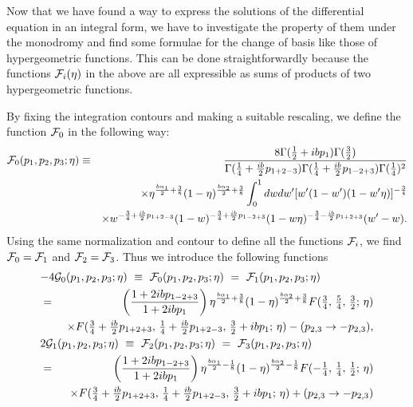 \documentclass[a4paper,12pt]{article}
\newcommand{\tfrac}[2]{{\textstyle\frac{#1}{#2}}}
\newcommand{\cF}{{\cal F}}
\newcommand{\cG}{{\cal G}}
\begin{document}
   Now that we have found a way to express the solutions of the
 differential equation in an integral form, we have to investigate
 the property of them under the monodromy and find some formulae
 for the change of basis like those of hypergeometric functions.
 This can be done straightforwardly because the functions $\cF_i(\eta)$
 in the above are all expressible as sums of products of
 two hypergeometric functions.

   By fixing the integration contours and making
 a suitable rescaling, we define the function $\cF_0$
 in the following way:
\begin{eqnarray}
 \cF_0(p_1,p_2,p_3;\eta)
 &\equiv&
  \frac{8\Gamma(\frac{1}{2}+ibp_1)\Gamma(\frac{3}{2})}
       {\Gamma(\frac{1}{4}+\frac{ib}{2}p_{1+2-3})
        \Gamma(\frac{1}{4}+\frac{ib}{2}p_{1-2+3})
        \Gamma(\frac{1}{4})^2}
\nonumber \\ && \times
  \eta    ^{\frac{b\alpha_1}{2}+\frac{3}{8}}
  (1-\eta)^{\frac{b\alpha_2}{2}+\frac{3}{8}}
  \int_0^1dwdw'
  [w'(1-w')(1-w'\eta)]^{-\frac{3}{4}}
\nonumber \\ && \times
  w^{-\frac{3}{4}+\frac{ib}{2}p_{1+2-3}}
  (1-w)^{-\frac{3}{4}+\frac{ib}{2}p_{1-2+3}}
  (1-w\eta)^{-\frac{3}{4}-\frac{ib}{2}p_{1+2+3}}
  (w'-w).
\end{eqnarray}
   Using the same normalization and contour to define all the functions
 $\cF_i$, we find $\cF_0=\cF_1$ and $\cF_2=\cF_3$.
 Thus we introduce the following functions
\begin{eqnarray}
\lefteqn{
 -4\cG_0(p_1,p_2,p_3;\eta) ~\equiv~
   \cF_0(p_1,p_2,p_3;\eta) ~=~
   \cF_1(p_1,p_2,p_3;\eta) }\nonumber \\
 &=&
  \left(\frac{1+2ibp_{1-2+3}}{1+2ibp_1}\right)
  \eta    ^{\frac{b\alpha_1}{2}+\frac{3}{8}}
  (1-\eta)^{\frac{b\alpha_2}{2}+\frac{3}{8}}
  F(\tfrac{3}{4},\,\tfrac{5}{4},\,\tfrac{3}{2};\,\eta)
\nonumber \\ && ~\times
  F(\tfrac{3}{4}+\tfrac{ib}{2}p_{1+2+3},\,
    \tfrac{1}{4}+\tfrac{ib}{2}p_{1+2-3},\,
    \tfrac{3}{2}+ibp_1;\,\eta)
  -(p_{2,3}\rightarrow -p_{2,3}),
\nonumber \\
\lefteqn{
  2\cG_1(p_1,p_2,p_3;\eta) ~\equiv~
   \cF_2(p_1,p_2,p_3;\eta) ~=~
   \cF_3(p_1,p_2,p_3;\eta) }\nonumber \\
 &=&
  \left(\frac{1+2ibp_{1-2+3}}{1+2ibp_1}\right)
  \eta    ^{\frac{b\alpha_1}{2}-\frac{1}{8}}
  (1-\eta)^{\frac{b\alpha_2}{2}-\frac{1}{8}}
  F(-\tfrac{1}{4},\,\tfrac{1}{4},\,\tfrac{1}{2};\,\eta)
\nonumber \\ && ~\times
  F(\tfrac{3}{4}+\tfrac{ib}{2}p_{1+2+3},\,
    \tfrac{1}{4}+\tfrac{ib}{2}p_{1+2-3},\,
    \tfrac{3}{2}+ibp_1;\,\eta)
  +(p_{2,3}\rightarrow -p_{2,3})
\end{eqnarray}
\end{document}
